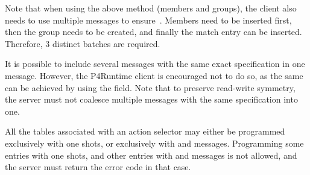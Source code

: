 \documentclass[11pt]{article}
\begin{document}
{%
\noindent{}Note that when using the above method (members and groups), the client also
needs to use multiple messages to ensure~. Members need to be inserted
first, then the group needs to be created, and finally the match entry can be
inserted. Therefore, 3 distinct  batches are required.%

It is possible to include several  messages with the same
exact  specification in one  message. However,
the P4Runtime client is encouraged not to do so, as the same can be achieved by
using the  field. Note that to preserve read-write symmetry, the server
must not coalesce multiple  messages with the same 
specification into one.%

All the tables associated with an action selector may either be programmed
exclusively with one shots, or exclusively with  and
 messages. Programming some entries with one shots, and
other entries with  and  messages is
not allowed, and the server must return the error code  in
that case.%

}
\end{document}
